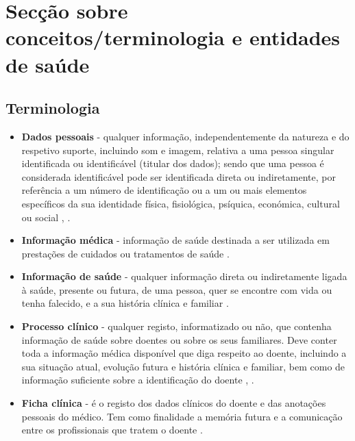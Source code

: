 \documentclass[conference]{IEEEtran}
\begin{document}
\section{Secção sobre conceitos/terminologia e entidades de saúde}


\subsection{Terminologia}

\begin{itemize}

	\item \textbf{Dados pessoais} - qualquer informação, independentemente da natureza e do respetivo suporte, incluindo som e imagem, relativa a uma pessoa singular identificada ou identificável (titular dos dados); sendo que uma pessoa é considerada identificável pode ser identificada direta ou indiretamente, por referência a um número de identificação ou a um ou mais elementos específicos da sua identidade física, fisiológica, psíquica, económica, cultural ou social \cite{parecerERS2015}, \cite{CNPDinfsaude2014}.
	
	\item \textbf{Informação médica} - informação de saúde destinada a ser utilizada em prestações de cuidados ou tratamentos de saúde \cite{regulamentodeonmedic}.
	
	\item \textbf{Informação de saúde} - qualquer informação direta ou indiretamente ligada à saúde, presente ou futura, de uma pessoa, quer se encontre com vida ou tenha falecido, e a sua história clínica e familiar \cite{consolidacaoinfsaude}.
	
	\item \textbf{Processo clínico} - qualquer registo, informatizado ou não, que contenha informação de saúde sobre doentes ou sobre os seus familiares. Deve conter toda a informação médica disponível que diga respeito ao doente, incluindo a sua situação atual, evolução futura e história clínica e familiar, bem como de informação suficiente sobre a identificação do doente \cite{regulamentodeonmedic}, \cite{parecerERS2015}. 
	
	\item \textbf{Ficha clínica} - é o registo dos dados clínicos do doente e das anotações pessoais do médico. Tem como finalidade a memória futura e a comunicação entre os profissionais que tratem o doente \cite{regulamentodeonmedic}.
	

\end{itemize}
\end{document}
